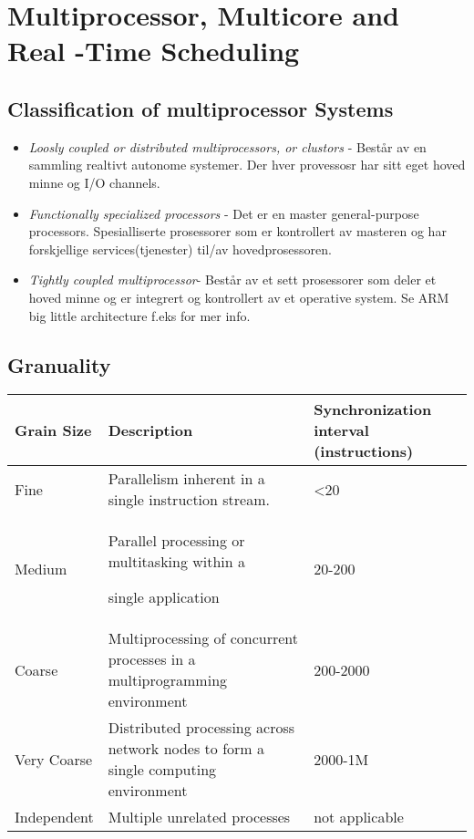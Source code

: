\chapter{Multiprocessor,
Multicore
and Real
-Time
Scheduling}

\section{Classification of multiprocessor Systems}
\begin{itemize}
\item 
\emph{Loosly coupled or distributed multiprocessors, or clustors} - Består av en sammling realtivt autonome systemer. Der hver provessosr har sitt eget hoved minne og I/O channels.
\item 
\emph{Functionally specialized processors} - Det er en master general-purpose processors. Spesialliserte prosessorer som er kontrollert av masteren og har forskjellige services(tjenester) til/av hovedprosessoren.
\item 
\emph{Tightly coupled multiprocessor}- Består av et sett prosessorer som deler et hoved minne og er integrert og kontrollert av et operative system. Se ARM big little architecture f.eks for mer info.
\end{itemize}

\section{Granuality}

\begin{center}
    \begin{tabular}{ | l | p{7cm} | p{3cm} |}
    \hline
    Grain Size & Description & Synchronization interval (instructions) \\ \hline
    Fine & Parallelism inherent in a single
instruction stream. & <20  \\ \hline
    Medium & Parallel processing or multitasking
within a 

single application & 20-200 \\ \hline
    Coarse & 
    Multiprocessing of concurrent processes
in a multiprogramming environment & 200-2000 \\ \hline
Very Coarse & 
    Distributed processing across network
nodes to form a single computing
environment & 2000-1M \\ \hline
Independent & 
    Multiple unrelated processes & not applicable \\ \hline
    \end{tabular}
\end{center}


